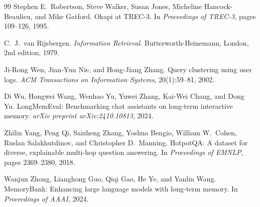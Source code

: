 \documentclass[11pt,a4paper]{article}
\begin{document}
\begin{thebibliography}{99}
Stephen E.\ Robertson, Steve Walker, Susan Jones, Micheline Hancock-Beaulieu, and Mike Gatford.
\newblock Okapi at TREC-3.
\newblock In \emph{Proceedings of TREC-3}, pages 109--126, 1995.

C.\ J.\ van Rijsbergen.
\newblock \emph{Information Retrieval}.
\newblock Butterworth-Heinemann, London, 2nd edition, 1979.

Ji-Rong Wen, Jian-Yun Nie, and Hong-Jiang Zhang.
\newblock Query clustering using user logs.
\newblock \emph{ACM Transactions on Information Systems}, 20(1):59--81, 2002.

Di Wu, Hongwei Wang, Wenhao Yu, Yuwei Zhang, Kai-Wei Chang, and Dong Yu.
\newblock LongMemEval: Benchmarking chat assistants on long-term interactive memory.
\newblock \emph{arXiv preprint arXiv:2410.10813}, 2024.

Zhilin Yang, Peng Qi, Saizheng Zhang, Yoshua Bengio, William W.\ Cohen, Ruslan Salakhutdinov, and Christopher D.\ Manning.
\newblock HotpotQA: A dataset for diverse, explainable multi-hop question answering.
\newblock In \emph{Proceedings of EMNLP}, pages 2369--2380, 2018.

Wanjun Zhong, Lianghong Guo, Qiqi Gao, He Ye, and Yanlin Wang.
\newblock MemoryBank: Enhancing large language models with long-term memory.
\newblock In \emph{Proceedings of AAAI}, 2024.

\end{thebibliography}
\end{document}
